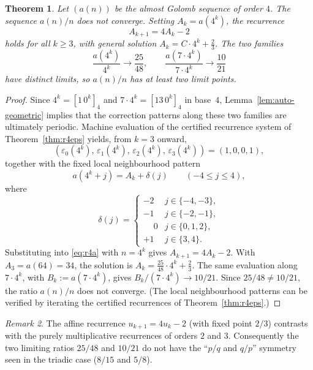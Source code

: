 \documentclass[12pt]{article}
\newtheorem{theorem}{Theorem}[section]
\theoremstyle{definition}
\theoremstyle{remark}
\newtheorem{remark}[theorem]{Remark}
\begin{document}
\begin{theorem}\label{thm:ratio4}
  Let $(a(n))$ be the almost Golomb sequence of order $4$.
  The sequence $a(n)/n$ does not converge. Setting $A_k=a(4^k)$,
  the recurrence
  \begin{equation}\label{eq:r4-rec}
    A_{k+1} = 4A_k - 2
  \end{equation}
  holds for all $k\ge 3$, with general solution $A_k = C\cdot 4^k + \tfrac{2}{3}$.
  The two families
  \[
    \frac{a(4^k)}{4^k} \to \frac{25}{48}, \qquad
    \frac{a(7\cdot 4^k)}{7\cdot 4^k} \to \frac{10}{21}
  \]
  have distinct limits, so $a(n)/n$ has at least two limit points.
\end{theorem}

\begin{proof}
  Since $4^k=[1\,0^k]_4$ and $7\cdot 4^k=[13\,0^k]_4$ in base~$4$,
  Lemma~\ref{lem:auto-geometric} implies that the correction patterns along
  these two families are ultimately periodic.
  Machine evaluation of the certified recurrence system
  of Theorem~\ref{thm:r4eps} yields, from $k=3$ onward,
  \[
    (\varepsilon_0(4^k),\,\varepsilon_1(4^k),\,\varepsilon_2(4^k),\,\varepsilon_3(4^k))
    =(1,0,0,1),
  \]
  together with the fixed local neighbourhood pattern
  \[
    a(4^k+j) = A_k + \delta(j) \qquad (-4\le j\le 4),
  \]
  where
  \[
    \delta(j) = \begin{cases}
      -2 & j\in\{-4,-3\},\\
      -1 & j\in\{-2,-1\},\\
      \phantom{-}0 & j\in\{0,1,2\},\\
      +1 & j\in\{3,4\}.
    \end{cases}
  \]
  Substituting into \eqref{eq:r4a} with $n=4^k$ gives
  $A_{k+1} = 4A_k - 2$.
  With $A_3 = a(64) = 34$, the solution is
  $A_k = \tfrac{25}{48}\cdot 4^k + \tfrac{2}{3}$.
  The same evaluation along $7\cdot 4^k$, with $B_k:=a(7\cdot 4^k)$, gives
  $B_k/(7\cdot 4^k)\to 10/21$.
  Since $25/48 \ne 10/21$, the ratio $a(n)/n$ does not converge.
  (The local neighbourhood patterns can be verified by
  iterating the certified recurrences of Theorem~\ref{thm:r4eps}.)
\end{proof}

\begin{remark}
  The affine recurrence $u_{k+1}=4u_k-2$ (with fixed point $2/3$) contrasts with
  the purely multiplicative recurrences of orders $2$ and $3$.
  Consequently the two limiting ratios $25/48$ and $10/21$ do not have the
  ``$p/q$ and $q/p$'' symmetry seen in the triadic case ($8/15$ and $5/8$).
\end{remark}
\end{document}
